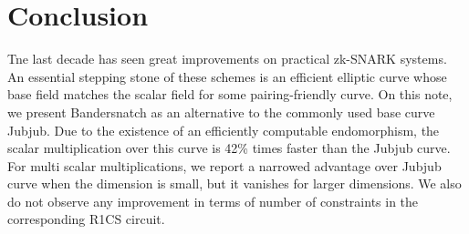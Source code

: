\documentclass[smallextended]{svjour3}
\begin{document}
\section{Conclusion}
Tne last decade has seen great improvements on practical zk-SNARK systems.
An essential stepping stone of these schemes is an efficient elliptic
curve whose base field matches the scalar field for some pairing-friendly curve.
On this note, we present Bandersnatch as an alternative to the commonly used
base curve Jubjub. Due to the existence of an efficiently computable
endomorphism, the scalar multiplication over this curve is 42\% times
faster than the Jubjub curve.
For multi scalar multiplications, we report a narrowed advantage over Jubjub 
curve when the dimension is small, but it vanishes for larger
dimensions.
We also do not observe any improvement in terms of number of constraints in 
the corresponding R1CS circuit.





\end{document}
